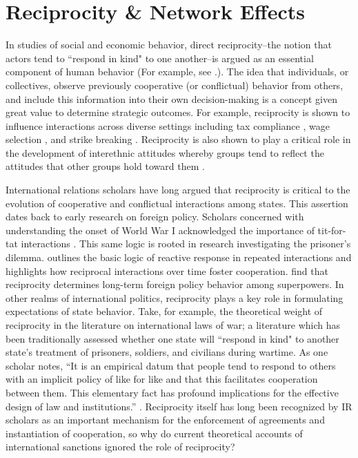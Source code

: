 \section*{Reciprocity \& Network Effects}
\label{neteffects}
In studies of social and economic behavior, direct reciprocity--the notion that actors tend to ``respond in kind" to one another--is argued as an essential component of human behavior (For example, see \cite{bolton:1998, charness:2002, charness:2004, cox:2007, cox:2004}.). The idea that individuals, or collectives, observe previously cooperative (or conflictual) behavior from others, and include this information into their own decision-making is a concept given great value to determine strategic outcomes. For example, reciprocity is shown to influence interactions across diverse settings including tax compliance \citep{smith:1990}, wage selection \citep{campbell:1997}, and strike breaking \citep{brett:1998}. Reciprocity is also shown to play a critical role in the development of interethnic attitudes whereby groups tend to reflect the attitudes that other groups hold toward them \citep{berry:1979}. 

 International relations scholars have long argued that reciprocity is critical to the evolution of cooperative and conflictual interactions among states. This assertion dates back to early research on foreign policy. Scholars concerned with understanding the onset of World War I acknowledged the importance of tit-for-tat interactions \citep{holsti1972}. This same logic is rooted in research investigating the prisoner's dilemma. \cite{axelrod:1985} outlines the basic logic of reactive response in repeated interactions and highlights how reciprocal interactions over time foster cooperation. \cite{rajmaira:1990} find that reciprocity determines long-term foreign policy behavior among superpowers. In other realms of international politics, reciprocity plays a key role in formulating expectations of state behavior. Take, for example, the theoretical weight of reciprocity in the literature on international laws of war; a literature which has been traditionally assessed whether one state will ``respond in kind" to another state's treatment of prisoners, soldiers, and civilians during wartime. As one scholar notes, ``It is an empirical datum that people tend to respond to others with an implicit policy of like for like and that this facilitates cooperation between them. This elementary fact has profound implications for the effective design of law and institutions.'' \cite[p. 19]{osiel:2009}. Reciprocity itself has long been recognized by IR scholars as an important mechanism for the enforcement of agreements and instantiation of cooperation, so why do current theoretical accounts of international sanctions ignored the role of reciprocity? 

